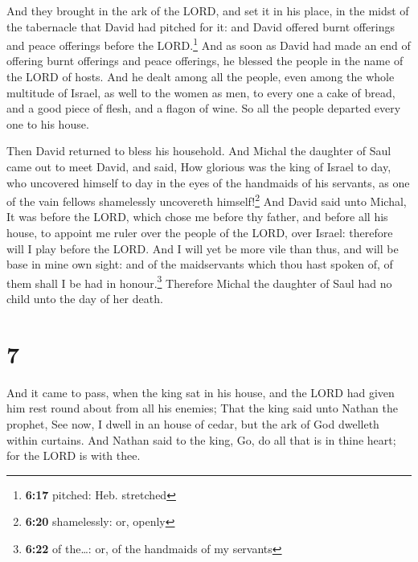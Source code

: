  And they brought in the ark of the LORD, and set it in
his place, in the midst of the tabernacle that David had pitched for it:
and David offered burnt offerings and peace offerings before the
LORD.\footnote{\textbf{6:17} pitched: Heb. stretched} 
And as soon as David had made an end of offering burnt offerings and
peace offerings, he blessed the people in the name of the LORD of hosts.
 And he dealt among all the people, even among the whole
multitude of Israel, as well to the women as men, to every one a cake of
bread, and a good piece of flesh, and a flagon of wine. So all the
people departed every one to his house.

 Then David returned to bless his household. And Michal
the daughter of Saul came out to meet David, and said, How glorious was
the king of Israel to day, who uncovered himself to day in the eyes of
the handmaids of his servants, as one of the vain fellows shamelessly
uncovereth himself!\footnote{\textbf{6:20} shamelessly: or, openly}
 And David said unto Michal, It was before the LORD,
which chose me before thy father, and before all his house, to appoint
me ruler over the people of the LORD, over Israel: therefore will I play
before the LORD.  And I will yet be more vile than thus,
and will be base in mine own sight: and of the maidservants which thou
hast spoken of, of them shall I be had in honour.\footnote{\textbf{6:22}
  of the\ldots: or, of the handmaids of my servants} 
Therefore Michal the daughter of Saul had no child unto the day of her
death.

\hypertarget{section-6}{%
\section{7}\label{section-6}}

 And it came to pass, when the king sat in his house, and
the LORD had given him rest round about from all his enemies;
 That the king said unto Nathan the prophet, See now, I
dwell in an house of cedar, but the ark of God dwelleth within curtains.
 And Nathan said to the king, Go, do all that is in thine
heart; for the LORD is with thee.

